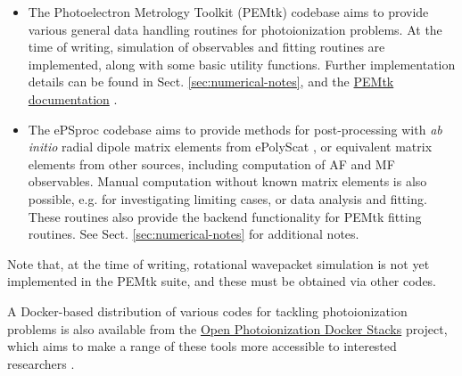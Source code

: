 \documentclass[10pt]{article}
\begin{document}
\begin{itemize}
\item The Photoelectron Metrology Toolkit (PEMtk) codebase \cite{hockett2021PEMtkDocs, hockett2021PEMtkGithub} aims to provide various general data handling routines for photoionization problems. At the time of writing, simulation of observables and fitting routines are implemented, along with some basic utility functions. Further implementation details can be found in Sect. \ref{sec:numerical-notes}, and the \href{https://pemtk.readthedocs.io/en/latest/about.html}{PEMtk documentation} \cite{hockett2021PEMtkDocs}.
\item The ePSproc codebase \cite{ePSprocAuthorea, ePSprocGithub, ePSprocDocs} aims to provide methods for post-processing with \textit{ab initio} radial dipole matrix elements from ePolyScat \cite{Lucchese1986, Gianturco1994, Natalense1999, luccheseEPolyScatUserManual}, or equivalent matrix elements from other sources, including computation of AF and MF observables. Manual computation without known matrix elements is also possible, e.g. for investigating limiting cases, or data analysis and fitting. These routines also provide the backend functionality for PEMtk fitting routines. See Sect. \ref{sec:numerical-notes} for additional notes.
\end{itemize}

Note that, at the time of writing, rotational wavepacket simulation is not yet implemented in the PEMtk suite, and these must be obtained via other codes. %

A Docker-based distribution of various codes for tackling photoionization problems is also available from the \href{https://github.com/phockett/open-photoionization-docker-stacks}{Open Photoionization Docker Stacks} project, which aims to make a range of these tools more accessible to interested researchers \cite{hockettOpenPhotoionizationDocker}.







\end{document}

